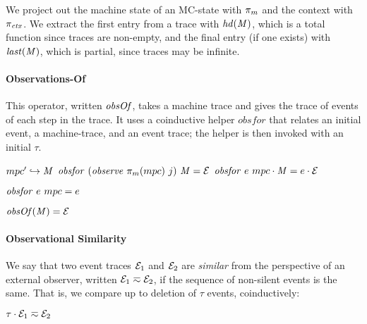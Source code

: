 \documentclass[10pt,conference]{ieeetran}%
\theoremstyle{definition}
\begin{document}
We project out the machine state of an MC-state with \(\pi_m\)
and the context with \(\pi_{\mathit{ctx}}\).
We extract the first entry from a trace with \(\mathit{hd}(\mathit{M})\), which is a total
function since traces are non-empty, and the final entry (if one exists) with
\(\mathit{last}(\mathit{M})\), which is partial, since traces may be infinite.

\paragraph*{Observations-Of}

This operator, written \(\mathit{obsOf}\), takes a machine trace and
gives the trace of events of each step in
the trace. It uses a coinductive helper \(\mathit{obsfor}\) that relates an
initial event, a machine-trace, and an event trace; the helper is
then invoked with an initial \(\tau\).

                  {\(mpc' \hookrightarrow \mathit{M}\)}
                  {\(\mathit{obsfor} ~ (\mathit{observe} ~ \pi_m(mpc) ~ j) ~ \mathit{M} = \mathcal{E}\)}
                  {\(\mathit{obsfor} ~ e ~ mpc \cdot \mathit{M} = e \cdot \mathcal{E}\)}

\begin{minipage}[b]{.4\columnwidth}
  \judgment{}
           {\(\mathit{obsfor} ~ e ~ mpc = e\)}
\end{minipage}
\begin{minipage}[b]{.4\columnwidth}
         {\(\mathit{obsOf}(\mathit{M}) = \mathcal{E}\)}
\end{minipage}

\paragraph*{Observational Similarity}

We say that two event traces $\mathcal{E}_1$ and $\mathcal{E}_2$ are {\em similar}
from the perspective of an external observer, written \(\mathcal{E}_1 \eqsim
\mathcal{E}_2\), if the sequence of non-silent events is the same. That is, we
compare up to deletion of \(\tau\) events, coinductively:

\begin{minipage}{.4\columnwidth}
  \judgment{}{\(\obsT \eqsim \obsT\)}
\end{minipage}
\begin{minipage}{.4\columnwidth}
           {\(\tau \cdot \mathcal{E}_1 \eqsim \mathcal{E}_2\)}
\end{minipage}
\end{document}
